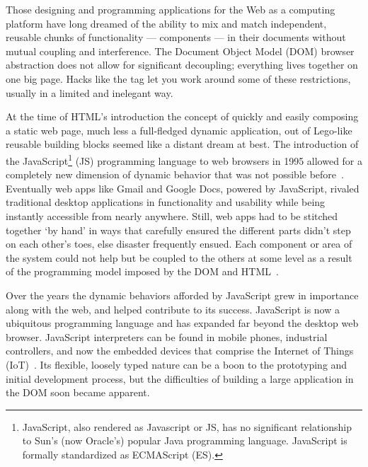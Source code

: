 Those designing and programming applications for the Web as a computing platform have long dreamed of the ability to mix and match independent, reusable chunks of functionality --- components --- in their documents without mutual coupling and interference. 
The Document Object Model (DOM)
browser abstraction does not allow for significant decoupling; 
everything lives together on one big page. Hacks like the 
tag let you work around some of these restrictions, usually in a limited and inelegant way.

At the time of HTML's introduction the concept of quickly and easily composing a static web page, 
much less a full-fledged dynamic application, 
out of Lego-like reusable building blocks seemed like a distant dream at best. 
The introduction of the 
JavaScript\footnote{JavaScript, also rendered as Javascript or JS, 
has no significant relationship to Sun's (now Oracle's) popular Java programming language. JavaScript is formally standardized as ECMAScript (ES).}
(JS) programming language to web browsers in 1995 allowed for a completely new dimension of dynamic behavior that was not possible before~\cite{w3ccontributors2012}.
Eventually web apps like Gmail and Google Docs, powered by JavaScript, rivaled traditional desktop applications in functionality and usability while being instantly accessible from nearly anywhere.
Still, web apps had to be stitched together `by hand' in ways that carefully ensured the different parts didn't step on each other's toes, else disaster frequently ensued. 
Each component or area of the system could not help but be coupled to the others at some level as a result of the programming model imposed by the DOM and HTML~\cite{ihrig2012}.

Over the years the dynamic behaviors afforded by JavaScript grew in importance along with the web, and helped contribute to its success. 
JavaScript is now a ubiquitous programming language and has expanded far beyond the desktop web browser. 
JavaScript interpreters can be found in mobile phones, industrial controllers, and now the embedded devices that comprise the Internet of Things (IoT)~\cite{flaki2015}.
Its flexible, loosely typed nature can be a boon to the prototyping and initial development process,
but the difficulties of building a large application in the DOM soon became apparent.

